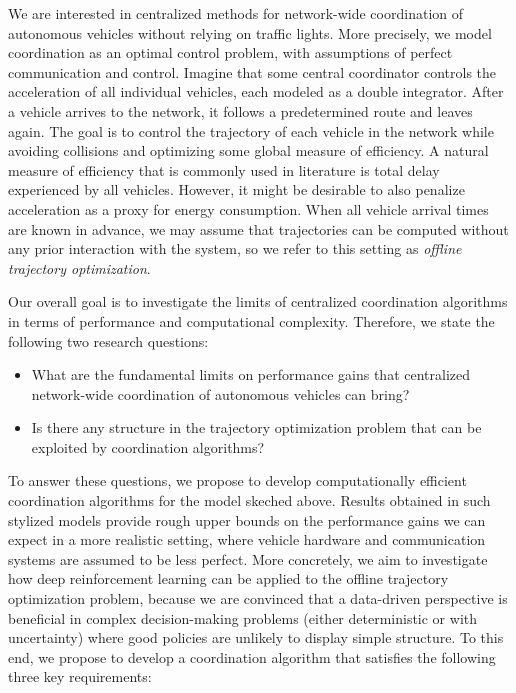 \documentclass[notitlepage]{report}
\begin{document}
We are interested in centralized methods for network-wide coordination of
autonomous vehicles without relying on traffic lights. More precisely, we model
coordination as an optimal control problem, with assumptions of perfect
communication and control.
%
Imagine that some central coordinator controls the acceleration of all individual vehicles, each modeled as a double integrator.
After a vehicle arrives to the network, it follows a predetermined route and leaves
again.
The goal is to control the trajectory of each vehicle in the network while
avoiding collisions and optimizing some global measure of efficiency.
A natural measure of efficiency that is commonly used in literature is total delay experienced by
all vehicles.
However, it might be desirable to also penalize acceleration as a proxy
for energy consumption.
When all vehicle arrival times are known in advance, we
may assume that trajectories can be computed without any prior interaction with the
system, so we refer to this setting as \textit{offline trajectory optimization}.

Our overall goal is to investigate the limits of centralized coordination
algorithms in terms of performance and computational complexity.
Therefore, we state the following two research questions:
\begin{itemize}
  \item What are the fundamental limits on performance gains that centralized
        network-wide coordination of autonomous vehicles can bring?
  \item Is there any structure in the trajectory optimization problem that can be
        exploited by coordination algorithms?
\end{itemize}

To answer these questions, we propose to develop computationally efficient
coordination algorithms for the model skeched above. Results obtained in such
stylized models provide rough upper bounds on the performance gains we can
expect in a more realistic setting, where vehicle hardware and communication
systems are assumed to be less perfect.
%
More concretely, we aim to investigate how deep reinforcement learning can be
applied to the offline trajectory optimization problem, because we are convinced
that a data-driven perspective is beneficial in complex decision-making problems
(either deterministic or with uncertainty) where good policies are unlikely to
display simple structure.
To this end, we propose to develop a coordination algorithm that satisfies the
following three key requirements:
\end{document}
